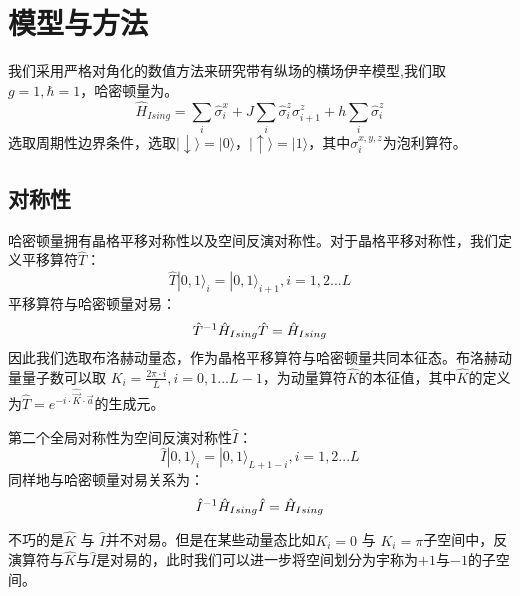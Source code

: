 \section{模型与方法}\label{4sec:method}
我们采用严格对角化的数值方法来研究带有纵场的横场伊辛模型,我们取$g=1,\hbar=1$，哈密顿量为。
\begin{equation}
\hat{H}_{Ising} = \sum_i\hat{\sigma}^x_i + J\sum_{i}\hat{\sigma}^z_i\sigma^z_{i+1} + h\sum_{i}\hat{\sigma}^z_i 
\label{Ising}
\end{equation}
选取周期性边界条件，选取$|\downarrow\rangle=|0\rangle$，$|\uparrow\rangle=|1\rangle$，其中$\sigma_i^{x,y,z}$为泡利算符。

\subsection{对称性}
哈密顿量拥有晶格平移对称性以及空间反演对称性。对于晶格平移对称性，我们定义平移算符$\hat{T}$：
\begin{equation}
	\hat{T} |0,1 \rangle_{i} =  |0,1 \rangle_{i+1}, i=1,2...L
\end{equation}
平移算符与哈密顿量对易：
\begin{equation}
	\hat{T}^{-1}\hat{H}_{Ising}\hat{T} = \hat{H}_{Ising}\\
\end{equation}
因此我们选取布洛赫动量态，作为晶格平移算符与哈密顿量共同本征态。布洛赫动量量子数可以取 $K_i=\frac{2\pi\cdot i}{L},i=0,1...L-1$，为动量算符$\hat{K}$的本征值，其中$\hat{K}$的定义为$\hat{T} = e^{-i\cdot\hat{\vec{K} }\cdot \vec{a}}$的生成元。

第二个全局对称性为空间反演对称性$\hat{I}$：
\begin{equation}
	\hat{I} |0,1 \rangle_{i} =  |0,1 \rangle_{L+1-i}, i=1,2...L
\end{equation}
同样地与哈密顿量对易关系为：
\begin{equation}
	\hat{I}^{-1}\hat{H}_{Ising}\hat{I} = \hat{H}_{Ising}\\
\end{equation}

不巧的是$\hat{K}$ 与 $\hat{I}$并不对易。但是在某些动量态比如$K_i=0$ 与 $K_i=\pi$子空间中，反演算符与$\hat{K}$与$\hat{I}$是对易的，此时我们可以进一步将空间划分为宇称为$+1$与$-1$的子空间。
\begin{comment}
在做了如上所述的块对角化之后，我们将要严格对角化的矩阵维度最大为动量宇称$KP=0+$
子空间的维度$L=18,KP=0+$，此时$D=7685$。
\end{comment}


